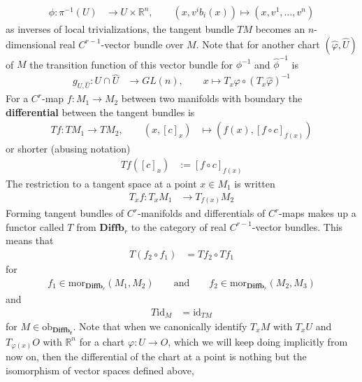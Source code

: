 \begin{align*}
  \phi
  \colon
  \pi^{-1}(U)
  &\to
  U
  \times
  \mathbb{R}^{n}
  ,\qquad
  \left(
    x
    ,
    v^{i}
    b_{i}(x)
  \right)
  \mapsto
  \left(
    x
    ,
    v^{1}
    ,
    \ldots
    ,
    v^{n}
  \right)
\end{align*}
as inverses of local trivializations, the tangent bundle $TM$ becomes an $n$-dimensional real $C^{r-1}$-vector bundle over $M$. Note that for another chart $(\hat{\varphi},\hat{U})$ of $M$ the transition function of this vector bundle for $\phi^{-1}$ and $\hat{\phi}^{-1}$ is
\begin{align*}
  g_{U,\hat{U}}
  \colon
  U
  \cap
  \hat{U}
  &\to
  GL(n)
  ,\qquad
  x
  \mapsto
  T_{x}\varphi
  \circ
  (T_{x}\hat{\varphi})^{-1}
\end{align*}
For a $C^{r}$-map $f \colon M_{1} \to M_{2}$ between two manifolds with boundary the \textbf{differential} between the tangent bundles is
\begin{align*}
  Tf
  \colon
  TM_{1}
  \to
  TM_{2}
  ,\qquad
  (x,[c]_{x})
  &\mapsto
  (f(x),[f \circ c]_{f(x)})
\end{align*}
or shorter (abusing notation)
\begin{align*}
  Tf([c]_{x})
  &:=
  [f \circ c]_{f(x)}
\end{align*}
The restriction to a tangent space at a point $x \in M_{1}$ is written
\begin{align*}
  T_{x}f
  \colon
  T_{x}M_{1}
  &\to
  T_{f(x)}M_{2}
\end{align*}
Forming tangent bundles of $C^{r}$-manifolds and differentials of $C^{r}$-maps makes up a functor called $T$ from $\mathbf{Diffb}_{r}$ to the category of real $C^{r-1}$-vector bundles. This means that
\begin{align*}
  T(f_{2} \circ f_{1})
  &=
  Tf_{2}
  \circ
  Tf_{1}
\end{align*}
for
\begin{align*}
  f_{1}
  \in
  \mathrm{mor}_{\mathbf{Diffb}_{r}}(M_{1},M_{2})
  \qquad
  \text{and}
  \qquad
  f_{2}
  \in
  \mathrm{mor}_{\mathbf{Diffb}_{r}}(M_{2},M_{3})
\end{align*}
and
\begin{align*}
  T\mathrm{id}_{M}
  &=
  \mathrm{id}_{TM}
\end{align*}
for $M \in \mathrm{ob}_{\mathbf{Diffb_{r}}}$. Note that when we canonically identify $T_{x}M$ with $T_{x}U$ and $T_{\varphi(x)}O$ with $\mathbb{R}^{n}$ for a chart $\varphi \colon U \to O$, which we will keep doing implicitly from now on, then the differential of the chart at a point is nothing but the isomorphism of vector spaces defined above,
